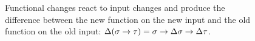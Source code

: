 \begin{figure}
\centering
{}
\caption{Functional changes react to input changes and produce
the difference between the new function on the new input and the
old function on the old input:
$\Delta(\sigma\to\tau)=\sigma\to\Delta\sigma\to\Delta\tau$.}
\label{fig:function-change}
\end{figure}
